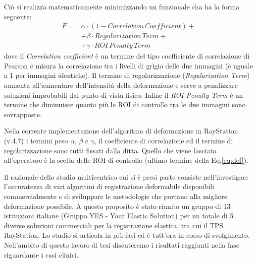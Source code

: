 Ciò si realizza matematicamente minimizzando un funzionale cha ha la forma seguente:
\begin{equation}
\label{eq:def}
\begin{split}
F =& \alpha \cdot (1- Correlation\, Coefficient) + \\
   & + \beta \cdot Regularization\,Term + \\
   & + \gamma \cdot ROI\,Penalty\,Term
\end{split}
\end{equation}
dove il \textit{Correlation coefficient} è un termine del tipo coefficiente di correlazione di Pearson e misura la correlazione tra i livelli di grigio delle due immagini (è uguale a 1 per immagini identiche). Il termine di regolarizzazione (\textit{Regularization Term}) aumenta all'aumentare dell'intensità della deformazione e serve a penalizzare soluzioni improbabili dal punto di vista fisico. Infine il \textit{ROI Penalty Term} è un termine che diminuisce quanto più le ROI di controllo tra le due immagini sono sovrapposte.

Nella corrente implementazione dell'algoritmo di deformazione in RayStation (v.4.7) i termini peso $\alpha$, $\beta$ e $\gamma$, il coefficiente di correlazione ed il termine di regolarizzazione sono tutti fissati dalla ditta. Quello che viene lasciato all'operatore è la scelta delle ROI di controllo (ultimo termine della Eq.\eqref{eq:def}).

Il razionale dello studio multicentrico cui si è presi parte consiste nell'investigare l'accuratezza di vari algoritmi di registrazione deformabile disponibili commercialmente e di sviluppare le metodologie che portano alla migliore deformazione possibile. A questo proposito è stato riunito un gruppo di 13 istituzioni italiane (Gruppo YES - Your Elastic Solution) per un totale di 5 diverse soluzioni commerciali per la registrazione elastica, tra cui il TPS RayStation. Lo studio si articola in più fasi ed è tutt'ora in corso di svolgimento. Nell'ambito di questo lavoro di tesi discuteremo i risultati raggiunti nella fase riguardante i casi clinici.

